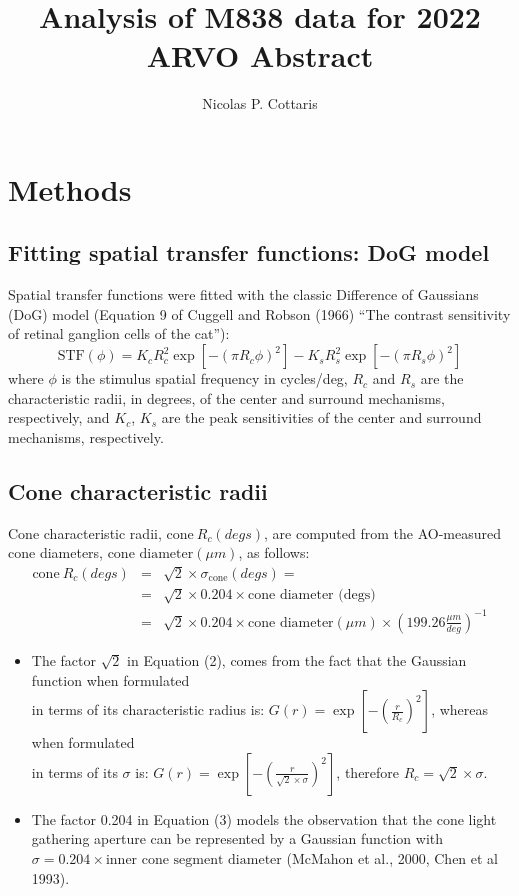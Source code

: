 \documentclass[11pt, oneside]{article}   	%
\title{Analysis of M838 data for 2022 ARVO Abstract}
\author{Nicolas P. Cottaris}
\date{}							%
\begin{document}
\maketitle
\section{Methods}
\subsection{Fitting spatial transfer functions: DoG model}
Spatial transfer functions were fitted with the classic Difference of Gaussians (DoG) model (Equation 9 of Cuggell and Robson (1966) ``The contrast sensitivity of retinal ganglion cells of the cat''):
\begin{equation}
 \mbox{STF}(\phi) = 
 K_c R_c^2 \exp{\left[ - \left( \pi R_c \phi \right)^2 \right]} - K_s R_s^2 \exp{\left[ - \left( \pi R_s \phi \right)^2 \right]} 
\end{equation}
where $\phi$ is the stimulus spatial frequency in cycles/deg, $R_c$ and $R_s$ are the characteristic radii, in degrees, of the center and surround mechanisms, respectively, and $K_c$, $K_s$ are the peak sensitivities of the center and surround mechanisms, respectively.

\subsection{Cone characteristic radii}
Cone characteristic radii, $\mbox{cone} ~ R_c (degs)$, are computed from the AO-measured cone diameters, $\mbox{cone diameter}(\mu m)$,  as follows: 
\begin{eqnarray}
\displaystyle
\mbox{cone} ~R_c (degs) & = & \sqrt{2} \times \sigma_{\mbox{cone}} (degs) = \\
& = & \sqrt{2} \times 0.204 \times  \mbox{cone diameter (degs)} \\
& = & \sqrt{2} \times 0.204 \times \mbox{cone diameter}(\mu m) \times {\left( 199.26 \frac{\mu m}{deg} \right)}^{-1}
\end{eqnarray}
\begin{itemize}
\item The factor $\sqrt{2}$ in Equation (2), comes from the fact that the Gaussian function when formulated \\
in terms of its characteristic radius is: $\displaystyle G(r) = \exp{\left[ -\left( \frac{r}{R_c} \right)^2 \right]}$, whereas when formulated \\
in terms of its $\sigma$ is: $\displaystyle G(r) = \exp{\left[ -\left( \frac{r}{\sqrt{2} \times \sigma} \right)^2 \right]}$, therefore $R_c = \sqrt{2} \times \sigma$. 

\item The factor 0.204 in Equation (3) models the observation that the cone light gathering aperture can be represented by a Gaussian function with $\sigma = 0.204 \times \mbox{inner cone segment diameter}$ (McMahon et al., 2000, Chen et al 1993).
\end{itemize}
\end{document}
